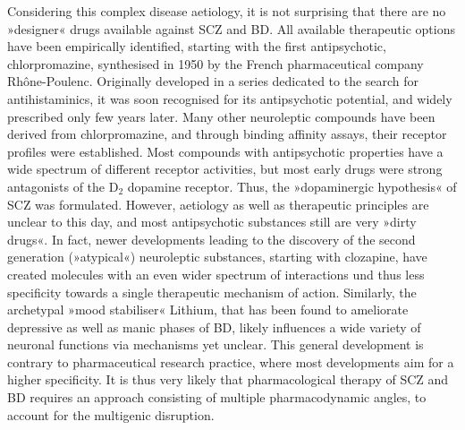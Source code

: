Considering this complex disease aetiology, it is not surprising that there are no »designer« drugs available against SCZ and BD. All available therapeutic options have been empirically identified, starting with the first antipsychotic, chlorpromazine, synthesised in 1950 by the French pharmaceutical company Rhône-Poulenc. Originally developed in a series dedicated to the search for antihistaminics, it was soon recognised for its antipsychotic potential, and widely prescribed only few years later. Many other neuroleptic compounds have been derived from chlorpromazine, and through binding affinity assays, their receptor profiles were established. Most compounds with antipsychotic properties have a wide spectrum of different receptor activities, but most early drugs were strong antagonists of the D$_2$ dopamine receptor. Thus, the »dopaminergic hypothesis« of SCZ was formulated. However, aetiology as well as therapeutic principles are unclear to this day, and most antipsychotic substances still are very »dirty drugs«. In fact, newer developments leading to the discovery of the second generation (»atypical«) neuroleptic substances, starting with clozapine, have created molecules with an even wider spectrum of interactions und thus less specificity towards a single therapeutic mechanism of action. Similarly, the archetypal »mood stabiliser« Lithium, that has been found to ameliorate depressive as well as manic phases of BD, likely influences a wide variety of neuronal functions via mechanisms yet unclear.\cite{Malhi2013} This general development is contrary to pharmaceutical research practice, where most developments aim for a higher specificity. It is thus very likely that pharmacological therapy of SCZ and BD requires an approach consisting of multiple pharmacodynamic angles, to account for the multigenic disruption.

